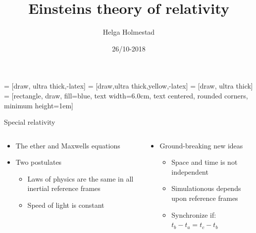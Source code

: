 \documentclass{beamer}
\title[]{Einsteins theory of relativity}
\author{Helga Holmestad}
\institute{University of Oslo}
\date{26/10-2018}
\begin{document}
\begin{frame}
  \titlepage
\end{frame}


   = [draw, ultra thick,-latex]
       = [draw,ultra thick,yellow,-latex]
       = [draw, ultra thick]
       = [rectangle, draw, fill=blue, 
        text width=6.0cm, text centered, rounded corners, minimum height=1em]
      
\begin{frame}{\centering Special relativity}
  \begin{columns}
    \begin{column}{0.5\textwidth}
      \begin{itemize}
      \item<1->{The ether and Maxwells equations}
      \item<2->{Two postulates }
        \begin{itemize}
        \item<2->{Laws of physics are the same in all inertial reference frames}
        \item<2->{Speed of light is constant}
        \end{itemize}
      \end{itemize}
    \end{column}
    \begin{column}{0.5\textwidth}
      \begin{itemize}
        \item<3->{Ground-breaking new ideas}
        \begin{itemize}
        \item<3->{Space and time is not independent}
        \item<3->{Simulationous depends upon reference frames}
        \item<7->{Synchronize if:$t_b-t_a=t_c-t_b$}
        \end{itemize}
        \end{itemize}
         \end{column}
  \end{columns}  
  \begin{center}
\end{center}
\end{frame}
\end{document}
